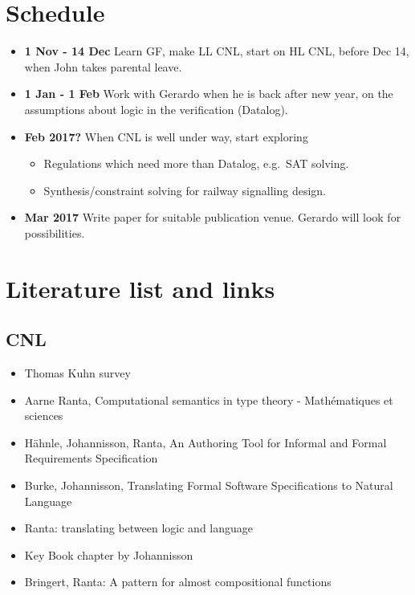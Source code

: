 \documentclass[]{article}
\providecommand{\tightlist}{%
  \setlength{\itemsep}{0pt}\setlength{\parskip}{0pt}}
\begin{document}
\pagebreak

\section{Schedule}\label{schedule}

\begin{itemize}
\tightlist
\item
  \textbf{1 Nov - 14 Dec} Learn GF, make LL CNL, start on HL CNL, before
  Dec 14, when John takes parental leave.
\item
  \textbf{1 Jan - 1 Feb} Work with Gerardo when he is back after new
  year, on the assumptions about logic in the verification (Datalog).
\item
  \textbf{Feb 2017?} When CNL is well under way, start exploring

  \begin{itemize}
  \tightlist
  \item
    Regulations which need more than Datalog, e.g.~SAT solving.
  \item
    Synthesis/constraint solving for railway signalling design.
  \end{itemize}
\item
  \textbf{Mar 2017} Write paper for suitable publication venue. Gerardo
  will look for possibilities.
\end{itemize}

\pagebreak

\section{Literature list and links}\label{literature-list-and-links}

\subsection{CNL}\label{cnl}

\begin{itemize}
\tightlist
\item
  Thomas Kuhn survey
\item
  Aarne Ranta, Computational semantics in type theory - Mathématiques et
  sciences
\item
  Hähnle, Johannisson, Ranta, An Authoring Tool for Informal and Formal
  Requirements Specification
\item
  Burke, Johannisson, Translating Formal Software Specifications to
  Natural Language
\item
  Ranta: translating between logic and language
\item
  Key Book chapter by Johannisson
\item
  Bringert, Ranta: A pattern for almost compositional functions
\end{itemize}
\end{document}
